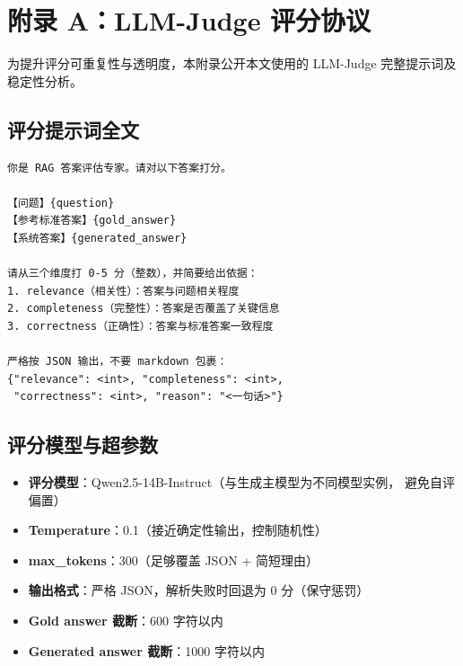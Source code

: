 \appendix

\section{附录 A：LLM-Judge 评分协议}
\label{appendix:judge}

为提升评分可重复性与透明度，本附录公开本文使用的 LLM-Judge 完整提示词及稳定性分析。

\subsection{评分提示词全文}

\begin{lstlisting}[language={}, basicstyle=\small\ttfamily,
                   breaklines=true, frame=single, rulecolor=\color{gray}]
你是 RAG 答案评估专家。请对以下答案打分。

【问题】{question}
【参考标准答案】{gold_answer}
【系统答案】{generated_answer}

请从三个维度打 0-5 分（整数），并简要给出依据：
1. relevance（相关性）：答案与问题相关程度
2. completeness（完整性）：答案是否覆盖了关键信息
3. correctness（正确性）：答案与标准答案一致程度

严格按 JSON 输出，不要 markdown 包裹：
{"relevance": <int>, "completeness": <int>,
 "correctness": <int>, "reason": "<一句话>"}
\end{lstlisting}

\subsection{评分模型与超参数}

\begin{itemize}
  \item \textbf{评分模型}：Qwen2.5-14B-Instruct（与生成主模型为不同模型实例，
        避免自评偏置）
  \item \textbf{Temperature}：0.1（接近确定性输出，控制随机性）
  \item \textbf{max\_tokens}：300（足够覆盖 JSON + 简短理由）
  \item \textbf{输出格式}：严格 JSON，解析失败时回退为 0 分（保守惩罚）
  \item \textbf{Gold answer 截断}：600 字符以内
  \item \textbf{Generated answer 截断}：1000 字符以内
\end{itemize}

